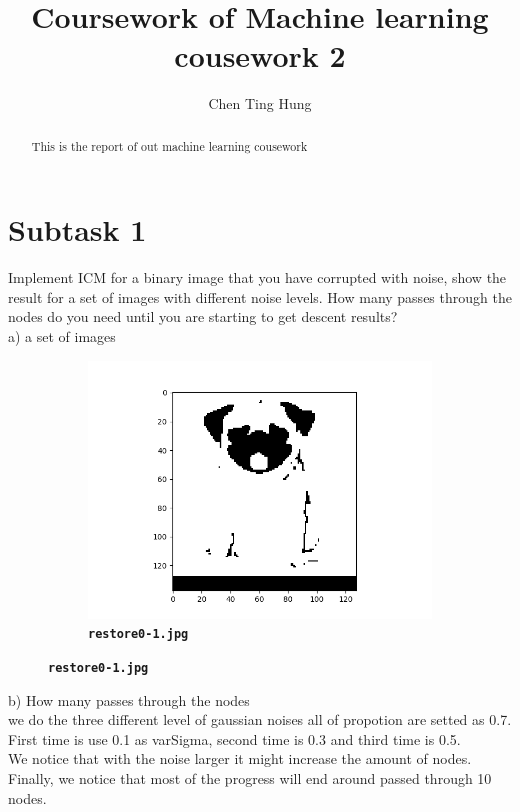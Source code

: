 \documentclass[12pt]{article}
\begin{document}
\title{Coursework of Machine learning cousework 2}



\author{Chen Ting Hung} {}
	
\maketitle

\begin{abstract}
This is the report of out machine learning cousework
\end{abstract}

\section{Subtask 1}
Implement ICM for a binary image that you have corrupted with noise, show the result for a set of images with different noise levels. How many passes through the nodes do you need until you are starting to get descent results?\\

a) a set of images\\
\begin{figure}[htb]
\centering
\begin{subfigure}[b]{.48\linewidth}
  \centering
  \includegraphics[width=\linewidth]{result/restore0-1.png}
  \caption{\textbf{\texttt{restore0-1.jpg}}}
\end{subfigure}
\label{fig:1}
\end{figure}

b) How many passes through the nodes\\
we do the three different level of gaussian noises all of propotion are setted as 0.7.\\ 
First time is use 0.1 as varSigma, second time is 0.3 and third time is 0.5.\\
We notice that with the noise larger it might increase the amount of nodes.\\
Finally, we notice that most of the progress will end around passed through 10 nodes.\\
\end{document}
